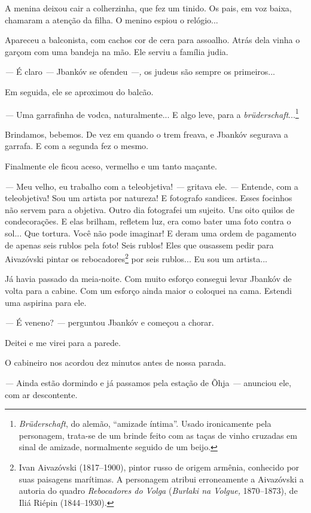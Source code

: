 A menina deixou cair a colherzinha, que fez um tinido. Os pais, em voz
baixa, chamaram a atenção da filha. O menino espiou o relógio...

Apareceu a balconista, com cachos cor de cera para assoalho. Atrás dela
vinha o garçom com uma bandeja na mão. Ele serviu a família judia.

\emph{---} É claro \emph{---} Jbankóv se ofendeu \emph{---,} os judeus
são sempre os primeiros...

Em seguida, ele se aproximou do balcão.

\emph{---} Uma garrafinha de vodca, naturalmente... E algo leve, para a
\emph{brüderschaft}...\footnote{\emph{Brüderschaft}, do alemão,
  ``amizade íntima''. Usado ironicamente pela personagem, trata-se de um
  brinde feito com as taças de vinho cruzadas em sinal de amizade,
  normalmente seguido de um beijo.}

Brindamos, bebemos. De vez em quando o trem freava, e Jbankóv segurava a
garrafa. E com a segunda fez o mesmo.

Finalmente ele ficou aceso, vermelho e um tanto maçante.

\emph{---} Meu velho, eu trabalho com a teleobjetiva! \emph{---} gritava
ele. \emph{---} Entende, com a teleobjetiva! Sou um artista por
natureza! E fotografo sandices. Esses focinhos não servem para a
objetiva. Outro dia fotografei um sujeito. Uns oito quilos de
condecorações. E elas brilham, refletem luz, era como bater uma foto
contra o sol... Que tortura. Você não pode imaginar! E deram uma ordem
de pagamento de apenas seis rublos pela foto! Seis rublos! Eles que
ousassem pedir para Aivazóvski pintar os rebocadores\footnote{Ivan
  Aivazóvski (1817--1900), pintor russo de origem armênia, conhecido por
  suas paisagens marítimas. A personagem atribui erroneamente a
  Aivazóvski a autoria do quadro \emph{Rebocadores do Volga}
  (\emph{Burlaki na Volgue,} 1870--1873), de Iliá Riépin (1844--1930).}
por seis rublos... Eu sou um artista...

Já havia passado da meia-noite. Com muito esforço consegui levar Jbankóv
de volta para a cabine. Com um esforço ainda maior o coloquei na cama.
Estendi uma aspirina para ele.

\emph{---} É veneno? \emph{---} perguntou Jbankóv e começou a chorar.

Deitei e me virei para a parede.

O cabineiro nos acordou dez minutos antes de nossa parada.

\emph{---} Ainda estão dormindo e já passamos pela estação de Õhja
\emph{---} anunciou ele, com ar descontente.

